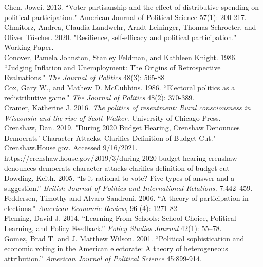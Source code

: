 \documentclass[12pt]{paper}
\begin{document}
\begin{hangparas}{.25in}{1}
Chen, Jowei. 2013. ``Voter partisanship and the effect of distributive spending on political participation." American Journal of Political Science 57(1): 200-217.
\\

Chmitorz, Andrea, Claudia Landwehr, Arndt Leininger, Thomas Schroeter, and Oliver Tüscher. 2020. "Resilience, self-efficacy and political participation." Working Paper.
\\

Conover, Pamela Johnston, Stanley Feldman, and Kathleen Knight. 1986. ``Judging Inflation and Unemployment: The Origins of Retrospective Evaluations." \textit{The Journal of Politics} 48(3): 565-88
\\

Cox, Gary W., and Mathew D. McCubbins. 1986. ``Electoral politics as a redistributive game." \textit{The Journal of Politics} 48(2): 370-389.
\\

Cramer, Katherine J. 2016. \textit{The politics of resentment: Rural consciousness in Wisconsin and the rise of Scott Walker.} University of Chicago Press.
\\

Crenshaw, Dan. 2019. "During 2020 Budget Hearing, Crenshaw Denounces Democrats’ Character Attacks, Clarifies Definition of Budget Cut." Crenshaw.House.gov. Accessed 9/16/2021. https://crenshaw.house.gov/2019/3/during-2020-budget-hearing-crenshaw-denounces-democrats-character-attacks-clarifies-definition-of-budget-cut
\\

Dowding, Keith. 2005. ``Is it rational to vote? Five types of answer and a suggestion.” \textit{British Journal of Politics and International Relations.} 7:442–459.
\\

Feddersen, Timothy and Alvaro Sandroni. 2006. ``A theory of participation in elections." \textit{American Economic Review}, 96 (4): 1271-82
\\

Fleming, David J. 2014. “Learning From Schools: School Choice, Political Learning, and Policy Feedback.” \textit{Policy Studies Journal} 42(1): 55–78.
\\

Gomez, Brad T. and J. Matthew Wilson. 2001. ``Political sophistication and economic voting in the American electorate: A theory of heterogeneous attribution.” \textit{American Journal of Political Science} 45:899-914.
\\


\end{hangparas}
\end{document}

